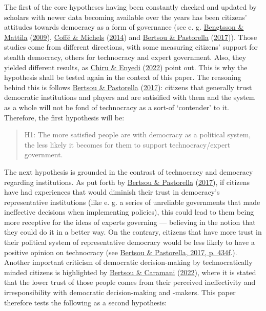 \documentclass[
  12pt,
  english,
]{article}
\begin{document}
The first of the core hypotheses having been constantly checked and
updated by scholars with newer data becoming available over the years
has been citizens' attitudes towards democracy as a form of governance
(see e. g. \protect\hyperlink{ref-bengtsson2009direct}{Bengtsson \&
Mattila} (\protect\hyperlink{ref-bengtsson2009direct}{2009}),
\protect\hyperlink{ref-coffe2014education}{Coffé \& Michels}
(\protect\hyperlink{ref-coffe2014education}{2014}) and
\protect\hyperlink{ref-bertsou2017technocratic}{Bertsou \& Pastorella}
(\protect\hyperlink{ref-bertsou2017technocratic}{2017})). Those studies
come from different directions, with some measuring citizens' support
for stealth democracy, others for technocracy and expert government.
Also, they yielded different results, as
\protect\hyperlink{ref-chiru2022wants}{Chiru \& Enyedi}
(\protect\hyperlink{ref-chiru2022wants}{2022}) point out. This is why
the hypothesis shall be tested again in the context of this paper. The
reasoning behind this is follows
\protect\hyperlink{ref-bertsou2017technocratic}{Bertsou \& Pastorella}
(\protect\hyperlink{ref-bertsou2017technocratic}{2017}): citizens that
generally trust democratic institutions and players and are satisified
with them and the system as a whole will not be fond of technocracy as a
sort-of `contender' to it. Therefore, the first hypothesis will be:

\begin{quote}
H1: The more satisfied people are with democracy as a political system,
the less likely it becomes for them to support technocracy/expert
government.
\end{quote}

The next hypothesis is grounded in the contrast of technocracy and
democracy regarding institutions. As put forth by
\protect\hyperlink{ref-bertsou2017technocratic}{Bertsou \& Pastorella}
(\protect\hyperlink{ref-bertsou2017technocratic}{2017}), if citizens
have had experiences that would diminish their trust in democracy's
representative institutions (like e. g. a series of unreliable
governments that made ineffective decisions when implementing policies),
this could lead to them being more receptive for the ideas of experts
governing --- believing in the notion that they could do it in a better
way. On the contrary, citizens that have more trust in their political
system of representative democracy would be less likely to have a
positive opinion on technocracy (see
\protect\hyperlink{ref-bertsou2017technocratic}{Bertsou \& Pastorella,
2017, p. 434f}.). Another important criticism of democratic
decision-making by technocratically minded citizens is highlighted by
\protect\hyperlink{ref-bertsou2022people}{Bertsou \& Caramani}
(\protect\hyperlink{ref-bertsou2022people}{2022}), where it is stated
that the lower trust of those people comes from their perceived
ineffectivity and irresponsibility with democratic decision-making and
-makers. This paper therefore tests the following as a second
hypothesis:
\end{document}
